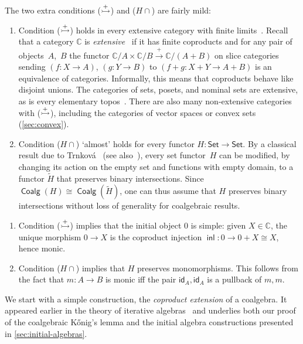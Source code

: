\documentclass[10pt,a4paper]{article}
\theoremstyle{definition}
\theoremstyle{remark}
\numberwithin{equation}{section}
\providecommand{\catname}{\mathsf}
\providecommand{\oname}[1]{{\mathop{\mathsf{#1}}\xspace}}
\def\Set{\catname{Set}}
\newcommand{\Konig}{Kőnig}
\providecommand{\id}{\mathsf{id}}
\providecommand{\xto}[1]{\,\xrightarrow{#1}\,}
\providecommand{\inl}{\oname{inl}}
\providecommand{\C}{}
\renewcommand{\C}{{\mathbb{C}}}
\renewcommand{\id}{{\mathsf{id}}}
\DeclareMathOperator{\Coalg}{\mathsf{Coalg}}
\newcommand{\xra}{\xrightarrow}
\renewcommand{\xto}{\xra}
\newcommand{\injmono}{\ensuremath{\overset{\smash{\raisebox{-1pt}{\ensuremath{\scriptstyle+}}}}{\rightarrowtail}}}\newcommand{\hpresint}{\ensuremath{H\cap}\xspace}
\theoremstyle{plain}
\theoremstyle{definition}
\begin{document}
\begin{rem}\label{rem:conditions}
The two extra conditions (\injmono) and (\hpresint) are fairly mild:
\begin{enumerate}
\item Condition (\injmono) holds in every extensive category with finite limits~\cite[Prop.~3.3]{cw93}. Recall that a category $\C$ is \emph{extensive}~\cite{cw93} if it has finite coproducts and for any pair of objects~$A$,~$B$ the functor $\C/A\times \C/B \xto{+} \C/(A+B)$ on slice categories sending $(f\colon X\to A)$, $(g\colon Y\to B)$ to $(f+g\colon X+Y\to A+B)$ is an equivalence of categories. Informally, this means that coproducts behave like disjoint unions. The categories of sets, posets, and nominal sets are extensive, as is every elementary topos~\cite{Johnstone}. There are also many non-extensive categories with (\injmono), including the categories of vector spaces or convex sets (\autoref{sec:convex}).
\item\label{rem:conditions:set-func-pres-int} Condition (\hpresint) `almost' holds for every functor $H\colon \Set\to \Set$. By a classical result due to Trnkov\'a~\cite{trnkova71} (see also~\cite[Prop.~8.1.13]{amm25}), every set functor~$H$ can be modified, by changing its action on the empty set and functions with empty domain, to a functor $\widetilde{H}$ that preserves binary intersections. Since $\Coalg(H)\cong \Coalg(\widetilde{H})$, one can thus assume that $H$ preserves binary intersections without loss of generality for coalgebraic results.
\end{enumerate} 
\end{rem}

\begin{rem}\label{rem:int-implies-mono}
\begin{enumerate}
\item Condition ($\injmono$) implies that the initial object $0$ is simple: given $X\in \C$, the unique morphism $0\to X$ is the coproduct injection $\inl\colon 0\to 0+X\cong X$, hence monic. 
\item Condition (\hpresint) implies that $H$ preserves monomorphisms. This follows from the fact that $m\colon A\to B$ is monic iff the pair $\id_A,\id_A$ is a pullback of $m,m$.
\end{enumerate}

\end{rem}

We start with a simple construction, the \emph{coproduct extension} of a coalgebra. It appeared earlier in the theory of iterative algebras~\cite{amv06,urbat17} and underlies both our proof of the coalgebraic \Konig's lemma and the initial algebra constructions presented in \autoref{sec:initial-algebras}. 
\end{document}
